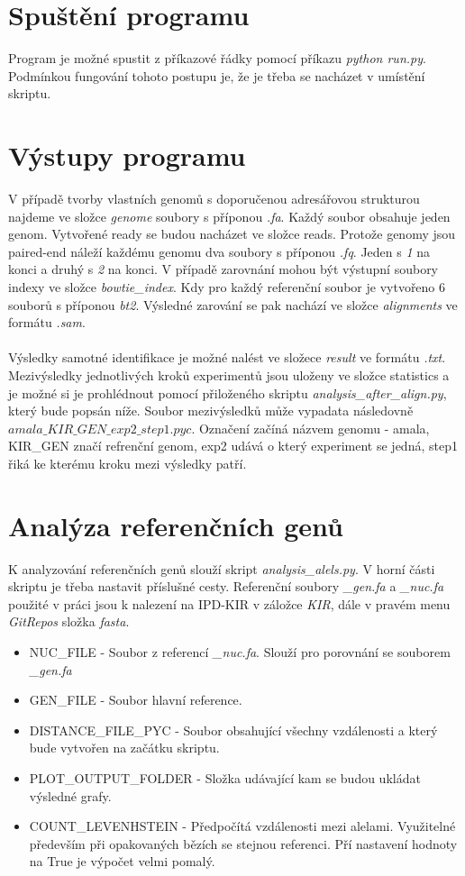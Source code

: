 \documentclass[czech,DP]{thesiskiv}
\numberwithin{equation}{section}
\begin{document}
\section{Spuštění programu}
Program je možné spustit z příkazové řádky pomocí příkazu \textit {python run.py}. Podmínkou fungování tohoto postupu je, že je třeba se nacházet v umístění skriptu. 

\section{Výstupy programu}
V případě tvorby vlastních genomů s doporučenou adresářovou strukturou najdeme ve složce \textit{genome} soubory s příponou \textit{.fa}. Každý soubor obsahuje jeden genom.
Vytvořené ready se budou nacházet ve složce reads. Protože genomy jsou paired-end náleží každému genomu dva soubory s příponou \textit{.fq}. Jeden s \textit{1} na konci a druhý s \textit{2} na konci. 
V případě zarovnání mohou být výstupní soubory indexy ve složce \textit{bowtie\_index}. Kdy pro každý referenční soubor je vytvořeno 6 souborů s příponou \textit{bt2}. Výsledné zarování se pak nachází ve složce \textit{alignments} ve formátu \textit{.sam}. 
\\
\\
Výsledky samotné identifikace je možné nalést ve složece \textit{result} ve formátu \textit{.txt}. Mezivýsledky jednotlivých kroků experimentů jsou uloženy ve složce statistics a je možné si je prohlédnout pomocí přiloženého skriptu \textit{analysis\_after\_align.py}, který bude popsán níže. Soubor mezivýsledků může vypadata následovně $amala\_KIR\_GEN\_exp2\_step1.pyc$.  Označení začíná názvem genomu - amala, KIR\_GEN značí refrenční genom, exp2 udává o který experiment se jedná, step1 řiká ke kterému kroku mezi výsledky patří. 



\section{Analýza referenčních genů}
K analyzování referenčních genů slouží skript \textit{analysis\_alels.py}. V horní části skriptu je třeba nastavit příslušné cesty. Referenční soubory \textit{\_gen.fa} a \textit{\_nuc.fa} použité v práci jsou k nalezení na IPD-KIR \cite{imgt_hla_database} v záložce \textit{KIR}, dále v pravém menu \textit{GitRepos} složka \textit{fasta}.

\begin{itemize}
	\item NUC\_FILE - Soubor z referencí \textit{\_nuc.fa}. Slouží pro porovnání se souborem \textit{\_gen.fa}
	\item GEN\_FILE - Soubor hlavní reference.
	\item DISTANCE\_FILE\_PYC - Soubor obsahující všechny vzdálenosti a který bude vytvořen na začátku skriptu.
	\item PLOT\_OUTPUT\_FOLDER - Složka udávající kam se budou ukládat výsledné grafy.
	\item COUNT\_LEVENHSTEIN - Předpočítá vzdálenosti mezi alelami. Využitelné především při opakovaných bězích se stejnou referenci. Pří nastavení hodnoty na True je výpočet velmi pomalý.
\end{itemize}
\end{document}
